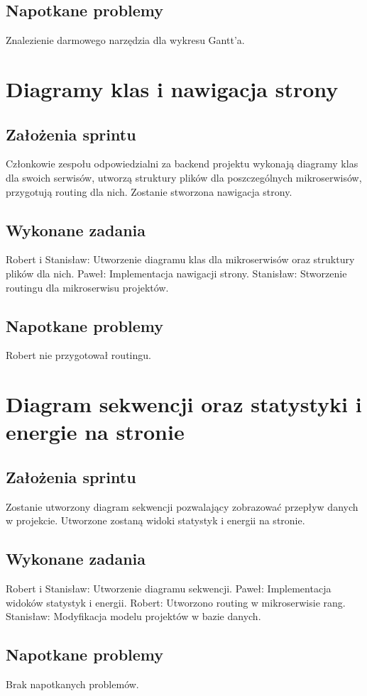 \documentclass[a4paper,11pt]{report}
\begin{document}
\subsection {Napotkane problemy}
Znalezienie darmowego narzędzia dla wykresu Gantt'a.

\section {Diagramy klas i nawigacja strony}
\subsection {Założenia sprintu}
Członkowie zespołu odpowiedzialni za backend projektu wykonają diagramy klas dla swoich serwisów, utworzą struktury plików dla poszczególnych mikroserwisów, przygotują routing dla nich. Zostanie stworzona nawigacja strony.
\subsection {Wykonane zadania}
Robert i Stanisław: Utworzenie diagramu klas dla mikroserwisów oraz struktury plików dla nich.
Paweł: Implementacja nawigacji strony. 
Stanisław: Stworzenie routingu dla mikroserwisu projektów.
\subsection {Napotkane problemy}
Robert nie przygotował routingu.

\section {Diagram sekwencji oraz statystyki i energie na stronie}
\subsection {Założenia sprintu}
Zostanie utworzony diagram sekwencji pozwalający zobrazować przepływ danych w projekcie. Utworzone zostaną widoki statystyk i energii na stronie.
\subsection {Wykonane zadania}
Robert i Stanisław: Utworzenie diagramu sekwencji.
Paweł: Implementacja widoków statystyk i energii. 
Robert: Utworzono routing w mikroserwisie rang.
Stanisław: Modyfikacja modelu projektów w bazie danych.
\subsection {Napotkane problemy}
Brak napotkanych problemów.
\end{document}
